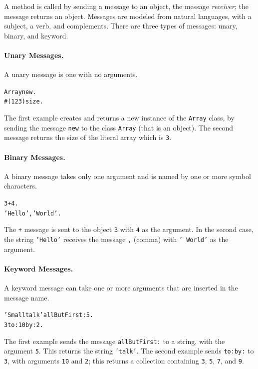 \documentclass[notumble]{leaflet}
\makeatletter
\newenvironment{displaycode}{%
    \par
    \begin{lrbox}{\code@box}%
        \begin{minipage}{\linewidth}
            \begin{alltt}\small}{
            \end{alltt}
        \end{minipage}
    \end{lrbox}
    \colorbox{light-gray}{\usebox{\code@box}}%
    \par}
\newcommand{\code}[1]{\foreignlanguage{english}{\texttt{#1}}}
\makeatother
\begin{document}
A method is called by sending a message to an object, the message
\emph{receiver}; the message returns an object. Messages are modeled
from natural languages, with a subject, a verb, and complements. There
are three types of messages: unary, binary, and keyword.

\paragraph{Unary Messages.}

A unary message is one with no arguments.

\begin{displaycode}
Array new.
#(1 2 3) size.
\end{displaycode}

The first example creates and returns a new instance of the
\code{Array} class, by sending the message \code{new} to the class
\code{Array} (that is an object). The second message returns the size
of the literal array which is \code{3}.

\paragraph{Binary Messages.}

A binary message takes only one argument and is named by one or more
symbol characters.

\begin{displaycode}
3 + 4.
'Hello', ' World'.
\end{displaycode}

The \code{+} message is sent to the object \code{3} with \code{4} as
the argument. In the second case, the string \code{'Hello'} receives the message \code{,} (comma) with \code{'~World'} as the argument.

\paragraph{Keyword Messages.}

A keyword message can take one or more arguments that are inserted in
the message name.

\begin{displaycode}
'Smalltalk' allButFirst: 5.
3 to: 10 by: 2.
\end{displaycode}

The first example sends the message \code{allButFirst:} to a string,
with the argument \code{5}. This returns the string
\code{'talk'}. The second example sends \code{to:by:} to
\code{3}, with arguments \code{10} and \code{2}; this
returns a collection containing \code{3}, \code{5}, \code{7},
and \code{9}.
\end{document}

